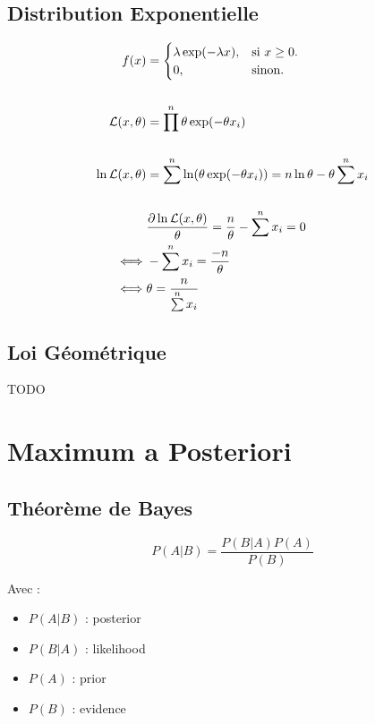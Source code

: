 \documentclass{article}
\begin{document}
\subsection{Distribution Exponentielle}

\begin{align*}
    f(x) &= \begin{cases}
        \lambda \exp(-\lambda x), & \text{si $x \geq 0$}.\\
        0, & \text{sinon}.
      \end{cases}
    \\ \\ 
    {\cal L}(x, \theta) &= \prod\limits^n \theta \exp(-\theta x_i) \\ \\
    \ln {\cal L}(x, \theta) &= \sum\limits^n \ln(\theta \exp(-\theta x_i)) = n\ln\theta - \theta \sum\limits^n x_i \\ \\
    &\frac{\partial \ln {\cal L}(x, \theta)}{\theta} = \frac{n}{\theta} -\sum\limits^n x_i = 0 \\
    \iff& -\sum\limits^n x_i = \frac{-n}{\theta} \\
    \iff& \theta = \frac{n}{\sum\limits^n x_i}
\end{align*}

\subsection{Loi Géométrique}

TODO



\section{Maximum a Posteriori}

\subsection{Théorème de Bayes}

\begin{equation}
    P(A|B) = \frac{P(B|A)P(A)}{P(B)}
\end{equation}

Avec : 
\begin{itemize}
    \item $P(A|B)$ : posterior
    \item $P(B|A)$ : likelihood
    \item $P(A)$ : prior
    \item $P(B)$ : evidence
\end{itemize}
\end{document}
